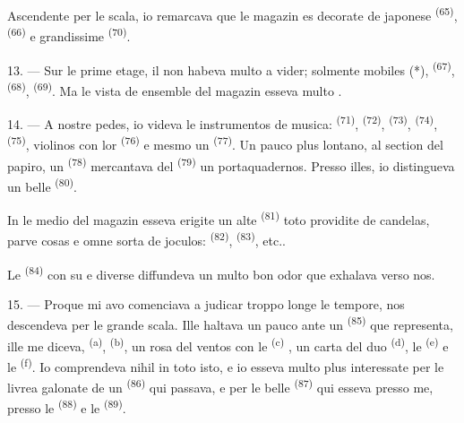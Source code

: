Ascendente per le scala, io remarcava que le magazin es decorate de
 japonese \textsuperscript{(65)}, 
\textsuperscript{(66)} e grandissime  \textsuperscript{(70)}.

13. --- Sur le prime etage, il non habeva multo a vider; solmente mobiles (*),
 \textsuperscript{(67)}, 
\textsuperscript{(68)},  \textsuperscript{(69)}.
Ma le vista de ensemble del magazin esseva multo .

14. --- A nostre pedes, io videva le instrumentos de musica: 
\textsuperscript{(71)},  \textsuperscript{(72)},
 \textsuperscript{(73)}, 
\textsuperscript{(74)},  \textsuperscript{(75)}, violinos con
lor  \textsuperscript{(76)} e mesmo un 
\textsuperscript{(77)}. Un pauco plus lontano, al section del papiro, un
 \textsuperscript{(78)} mercantava del 
\textsuperscript{(79)} un portaquadernos. Presso illes, io distingueva un belle
 \textsuperscript{(80)}.

In le medio del magazin esseva erigite un alte 
\textsuperscript{(81)} toto providite de candelas, parve cosas e omne sorta de
joculos:  \textsuperscript{(82)}, 
\textsuperscript{(83)}, etc..

Le  \textsuperscript{(84)} con su 
e diverse  diffundeva un multo bon odor que exhalava verso nos.

\VUsaut{3.4mm}
\VUsaut{2.8mm}

15. --- Proque mi avo comenciava a judicar troppo longe le tempore, nos descendeva
per le grande scala. Ille haltava un pauco ante un 
\textsuperscript{(85)} que representa, ille me diceva, 
\textsuperscript{(a)},  \textsuperscript{(b)},
un rosa del ventos con le 
\textsuperscript{(c)} , un carta del duo
 \textsuperscript{(d)}, le 
\textsuperscript{(e)} e le  \textsuperscript{(f)}. Io
comprendeva nihil in toto isto, e io esseva multo plus interessate per le livrea
galonate de un  \textsuperscript{(86)} qui passava,
e per le belle  \textsuperscript{(87)} qui esseva presso me,
presso le  \textsuperscript{(88)} e le 
\textsuperscript{(89)}.

